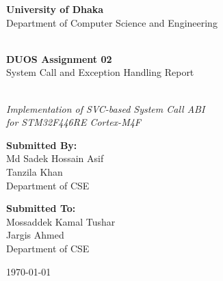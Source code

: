 \documentclass[11pt,a4paper]{article}
\begin{document}
\begin{titlepage}
  \centering
  \vspace*{1.5cm}
  
  {\Large\textbf{University of Dhaka}}\\[0.3cm]
  {\large Department of Computer Science and Engineering}\\[2cm]
  
  \\[0.5cm]
  
  {\huge\bfseries DUOS Assignment 02}\\[0.4cm]
  {\LARGE System Call and Exception Handling Report}\\[0.5cm]
  
  \\[1cm]
  
  {\large\textit{Implementation of SVC-based System Call ABI}}\\
  {\large\textit{for STM32F446RE Cortex-M4F}}\\[2.5cm]
  
  \begin{minipage}{0.45\textwidth}
    \begin{flushleft}
      \textbf{\large Submitted By:}\\[0.3cm]
      Md Sadek Hossain Asif\\
      Tanzila Khan\\
      Department of CSE
    \end{flushleft}
  \end{minipage}
  \hfill
  \begin{minipage}{0.45\textwidth}
    \begin{flushright}
      \textbf{\large Submitted To:}\\[0.3cm]
      Mossaddek Kamal Tushar\\
      Jargis Ahmed\\
      Department of CSE
    \end{flushright}
  \end{minipage}
  
  \vfill
  
  {\large \today}
  
\end{titlepage}
\end{document}

